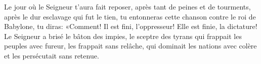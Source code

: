 Le jour où le Seigneur t’aura fait reposer,
	après tant de peines et de tourments,
	après le dur esclavage qui fut le tien,
	tu entonneras cette chanson contre le roi de Babylone,
	tu diras: «Comment! Il est fini, l’oppresseur! Elle est finie, la dictature!
Le Seigneur a brisé le bâton des impies, le sceptre des tyrans
	qui frappait les peuples avec fureur, les frappait sans relâche,
	qui dominait les nations avec colère et les persécutait sans retenue.
